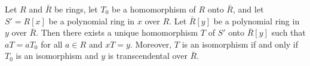 Let $R$ and $\bar{R}$ be rings, let $T_0$ be a homomorphism of $R$ onto $\bar{R}$, and let $S' = R[x]$ be a polynomial ring in $x$ over $R$. Let $\bar{R}[y]$ be a polynomial ring in $y$ over $\bar{R}$. Then there exists a unique homomorphism $T$ of $S'$ onto $\bar{R}[y]$ such that $aT = aT_0$ for all $a \in R$ and $xT = y$. Moreover, $T$ is an isomorphism if and only if $T_0$ is an isomorphism and $y$ is transcendental over $\bar{R}$.
